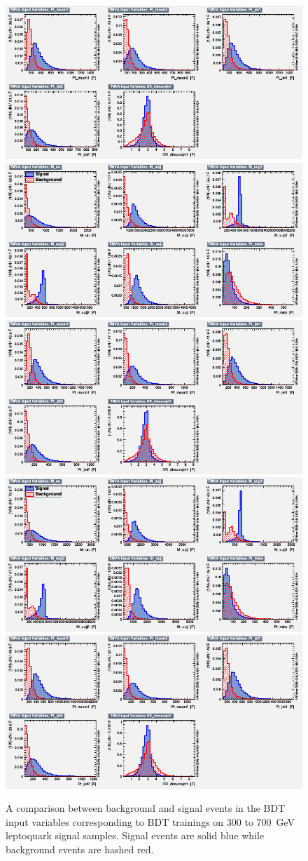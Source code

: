 \begin{figure}[H]
    {\includegraphics[width=.49\textwidth]{Images/Analysis/Results_LQToBMu_pair_uubj_BDTG_FullRun2_2023_01_25_020318/500/variables_id_c2.png}}
    {\includegraphics[width=.49\textwidth]{Images/Analysis/Results_LQToBMu_pair_uubj_BDTG_FullRun2_2023_01_25_020318/600/variables_id_c1.png}}
    {\includegraphics[width=.49\textwidth]{Images/Analysis/Results_LQToBMu_pair_uubj_BDTG_FullRun2_2023_01_25_020318/600/variables_id_c2.png}}
    {\includegraphics[width=.49\textwidth]{Images/Analysis/Results_LQToBMu_pair_uubj_BDTG_FullRun2_2023_01_25_020318/700/variables_id_c1.png}}
    {\includegraphics[width=.49\textwidth]{Images/Analysis/Results_LQToBMu_pair_uubj_BDTG_FullRun2_2023_01_25_020318/700/variables_id_c2.png}}
    \caption{A comparison between background and signal events in the BDT input variables corresponding to BDT trainings on 300 to \SI{700}{GeV} leptoquark signal samples. Signal events are solid blue while background events are hashed red.}
    \label{figapp:variables1}
\end{figure}

